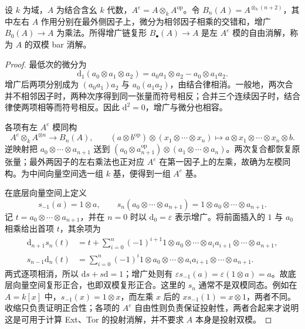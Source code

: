 \begin{proposition}\label{b4:prop:algebra-bar-resolution}
	设 \(k\) 为域，\(A\) 为结合含幺 \(k\) 代数，\(A^e=A\otimes_kA^{\mathrm{op}}\)。令 \(B_n(A)=A^{\otimes_k(n+2)}\)，其中左右 \(A\) 作用分别在最外侧因子上，微分为相邻因子相乘的交错和，增广 \(B_0(A)\to A\) 为乘法。所得增广链复形 \(B_\bullet(A)\to A\) 是左 \(A^e\) 模的自由消解，称为 \(A\) 的双模 bar 消解。
\end{proposition}
\begin{proof}
	最低次的微分为
	\[
		\mathrm{d}_1(a_0\otimes a_1\otimes a_2) =a_0a_1\otimes a_2-a_0\otimes a_1a_2.
	\]
	增广后两项分别成为 \((a_0a_1)a_2\) 与 \(a_0(a_1a_2)\)，由结合律相消。一般地，两次合并不相邻因子时，两种次序得到同一张量而符号相反；合并三个连续因子时，结合律使两项相等而符号相反。因此 \(\mathrm{d}^2=0\)，增广与微分也相容。

	各项有左 \(A^e\) 模同构
	\[
		A^e\otimes_k A^{\otimes n}\longrightarrow B_n(A),\qquad (a\otimes b^{\mathrm{op}})\otimes(x_1\otimes\cdots\otimes x_n) \longmapsto a\otimes x_1\otimes\cdots\otimes x_n\otimes b.
	\]
	逆映射把 \(a_0\otimes\cdots\otimes a_{n+1}\) 送到 \((a_0\otimes a_{n+1}^{\mathrm{op}})\otimes(a_1\otimes\cdots\otimes a_n)\)。两次复合都恢复原张量；最外两因子的左右乘法也正对应 \(A^e\) 在第一因子上的左乘，故确为左模同构。为中间向量空间选一组 \(k\) 基，便得到一组 \(A^e\) 基。

	在底层向量空间上定义
	\[
		s_{-1}(a)=1\otimes a,\qquad s_n(a_0\otimes\cdots\otimes a_{n+1}) =1\otimes a_0\otimes\cdots\otimes a_{n+1}.
	\]
	记 \(t=a_0\otimes\cdots\otimes a_{n+1}\)，并在 \(n=0\) 时以 \(\mathrm d_0=\varepsilon\) 表示增广。将前面插入的 \(1\) 与 \(a_0\) 相乘给出首项 \(t\)，其余项为
	\[
		\begin{aligned}
			\mathrm d_{n+1}s_n(t) &=t+\sum_{i=0}^n(-1)^{i+1} 1\otimes a_0\otimes\cdots\otimes a_i a_{i+1}\otimes\cdots\otimes a_{n+1},\\
			s_{n-1}\mathrm d_n(t) &=\sum_{i=0}^n(-1)^i 1\otimes a_0\otimes\cdots\otimes a_i a_{i+1}\otimes\cdots\otimes a_{n+1}.
		\end{aligned}
	\]
	两式逐项相消，所以 \(\mathrm{d}s+s\mathrm{d}=1\)；增广处则有 \(\varepsilon s_{-1}(a)=\varepsilon(1\otimes a)=a\)。故底层向量空间复形正合，也即双模复形正合。这里的 \(s_n\) 通常不是双模同态。例如在 \(A=k[x]\) 中，\(s_{-1}(x)=1\otimes x\)，而左乘 \(x\) 后的 \(x s_{-1}(1)=x\otimes1\)，两者不同。收缩只负责证明正合性；各项的 \(A^e\) 自由性则负责保证投射性，两者合起来才说明这是可用于计算 Ext、Tor 的投射消解，并不要求 \(A\) 本身是投射双模。
\end{proof}

